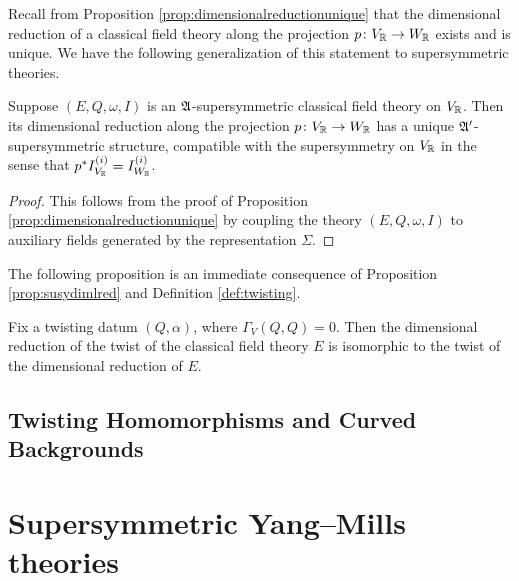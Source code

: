 \documentclass[10pt, oneside]{article}
\begin{document}
Recall from Proposition \ref{prop:dimensionalreductionunique} that the dimensional reduction of a classical field theory along the projection $p\colon V_\mathbb R\rightarrow W_\mathbb R$ exists and is unique. We have the following generalization of this statement to supersymmetric theories.

\begin{prop} \label{prop:susydimlred}
Suppose $(E, Q, \omega, I)$ is an $\mathfrak{A}$-supersymmetric classical field theory on $V_\mathbb R$. Then its dimensional reduction along the projection $p\colon V_\mathbb R\rightarrow W_\mathbb R$ has a unique $\mathfrak{A}'$-supersymmetric structure, compatible with the supersymmetry on $V_\mathbb R$ in the sense that $p^*I^{(i)}_{V_\mathbb R} = I^{(i)}_{W_\mathbb R}$.
\end{prop}

\begin{proof}
This follows from the proof of Proposition \ref{prop:dimensionalreductionunique} by coupling the theory $(E, Q, \omega, I)$ to auxiliary fields generated by the representation $\Sigma$.
\end{proof}

The following proposition is an immediate consequence of Proposition \ref{prop:susydimlred} and Definition \ref{def:twisting}.

\begin{prop}
Fix a twisting datum $(Q, \alpha)$, where $\Gamma_V(Q, Q) = 0$. Then the dimensional reduction of the twist of the classical field theory $E$ is isomorphic to the twist of the dimensional reduction of $E$.
\label{prop:twistdimensionalreduction}
\end{prop}

\subsection{Twisting Homomorphisms and Curved Backgrounds}


\section{Supersymmetric Yang--Mills theories} \label{sec:SYM}
\end{document}
